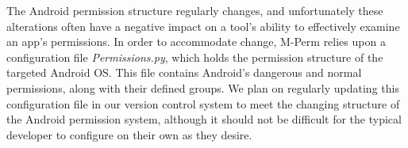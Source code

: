 \documentclass{sig-alternate-05-2015}
\newcommand{\todo}[1]{\textcolor{cyan}{\textbf{[#1]}}}
\begin{document}
The Android permission structure regularly changes, and unfortunately these alterations often have a negative impact on a tool's ability to effectively examine an app's permissions. In order to accommodate change, M-Perm relies upon a configuration file \emph{Permissions.py}, which holds the permission structure of the targeted Android OS. This file contains Android's dangerous and normal permissions, along with their defined groups. We plan on regularly updating this configuration file in our version control system to meet the changing structure of the Android permission system, although it should not be difficult for the typical developer to configure on their own as they desire.






















\end{document}
